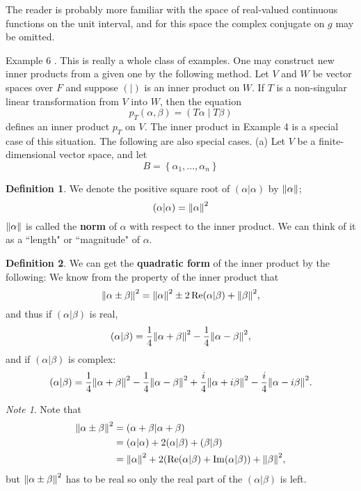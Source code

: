 \documentclass{book}
\theoremstyle{remark}
\newtheorem*{note}{Note}
\theoremstyle{definition}
\newtheorem{definition}{Definition}[section]
\begin{document}
The reader is probably more familiar with the space of real-valued continuous functions on the unit interval, and for this space the complex conjugate on $g$ may be omitted.

Example 6 . This is really a whole class of examples. One may construct new inner products from a given one by the following method. Let $V$ and $W$ be vector spaces over $F$ and suppose $(\mid)$ is an inner product on $W$. If $T$ is a non-singular linear transformation from $V$ into $W$, then the equation
$$
p_T(\alpha, \beta)=(T \alpha \mid T \beta)
$$
defines an inner product $p_T$ on $V$. The inner product in Example 4 is a special case of this situation. The following are also special cases.
(a) Let $V$ be a finite-dimensional vector space, and let
$$
B=\left\{\alpha_1, \ldots, \alpha_n\right\}
$$


\begin{definition}
We denote the positive square root of $(\alpha|\alpha)$ by $\norm{\alpha}$;
\begin{equation}
    (\alpha|\alpha) = \norm{\alpha}^2
\end{equation}
$\norm{\alpha}$ is called the \textbf{norm} of $\alpha$ with respect to the inner product. We can think of it as a ``length" or ``magnitude" of $\alpha$. 
\end{definition}


\begin{definition}
We can get the \textbf{quadratic form} of the inner product by the following:
We know from the property of the inner product that
\begin{equation}
    \norm{\alpha \pm \beta}^2 = \norm{\alpha}^2 \pm 2 \Re (\alpha | \beta) + \norm{\beta}^2,
\end{equation}
and thus if $(\alpha | \beta)$ is real, 
\begin{equation}
    (\alpha | \beta) = \frac{1}{4} \norm{\alpha + \beta}^2 - \frac{1}{4} \norm{\alpha - \beta}^2,
\end{equation}
and if $(\alpha | \beta)$ is complex: 
\begin{equation}
    (\alpha | \beta) = \frac{1}{4} \norm{\alpha + \beta}^2 - \frac{1}{4} \norm{\alpha - \beta}^2 + \frac{i}{4} \norm{\alpha + i\beta}^2 - \frac{i}{4} \norm{\alpha - i\beta}^2.
\end{equation}
\end{definition}

\begin{note}
Note that
\begin{align*}
\norm{\alpha \pm \beta}^2 &= (\alpha + \beta|\alpha + \beta)\\
&=(\alpha|\alpha) + 2(\alpha|\beta) + (\beta|\beta)\\
& = \norm{\alpha}^2 + 2(\Re (\alpha|\beta) + \Im (\alpha | \beta)) + \norm{\beta}^2,
\end{align*}
but $\norm{\alpha \pm \beta}^2$ has to be real so only the real part of the $(\alpha |\beta)$ is left. 
\end{note}
\end{document}
